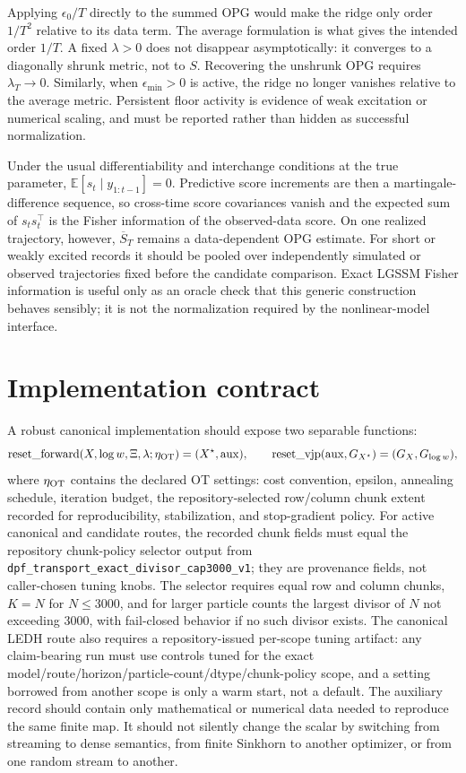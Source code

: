 Applying \(\epsilon_0/T\) directly to the summed OPG would make the ridge only
order \(1/T^2\) relative to its data term.  The average formulation is what
gives the intended order \(1/T\).  A fixed \(\lambda>0\) does not disappear
asymptotically: it converges to a diagonally shrunk metric, not to \(S\).
Recovering the unshrunk OPG requires \(\lambda_T\to0\).  Similarly, when
\(\epsilon_{\min}>0\) is active, the ridge no longer vanishes relative to the
average metric.  Persistent floor activity is evidence of weak excitation or
numerical scaling, and must be reported rather than hidden as successful
normalization.

Under the usual differentiability and interchange conditions at the true
parameter,
\(\mathbb E[s_t\mid y_{1:t-1}]=0\).  Predictive score increments are then a
martingale-difference sequence, so cross-time score covariances vanish and the
expected sum of \(s_ts_t^\top\) is the Fisher information of the observed-data
score.  On one realized trajectory, however, \(\overline S_T\) remains a
data-dependent OPG estimate.  For short or weakly excited records it should be
pooled over independently simulated or observed trajectories fixed before the
candidate comparison.  Exact LGSSM Fisher information is useful only as an
oracle check that this generic construction behaves sensibly; it is not the
normalization required by the nonlinear-model interface.

\section{Implementation contract}
\label{sec:bf-ledh-ot-implementation-contract}

A robust canonical implementation should expose two separable functions:
\[
  \operatorname{reset\_forward}(X,\log w,\Xi,\lambda;\eta_{\rm OT})
  =
  (X^\star,\mathrm{aux}),
  \qquad
  \operatorname{reset\_vjp}(\mathrm{aux},G_{X^\star})
  =
  (G_X,G_{\log w}),
\]
where \(\eta_{\rm OT}\) contains the declared OT settings: cost convention, epsilon,
annealing schedule, iteration budget, the repository-selected row/column chunk
extent recorded for reproducibility, stabilization, and stop-gradient policy.
For active canonical and candidate routes, the recorded chunk fields must equal
the repository chunk-policy selector output from
\texttt{dpf\_transport\_exact\_divisor\_cap3000\_v1}; they are provenance
fields, not caller-chosen tuning knobs.  The selector requires equal row and
column chunks, \(K=N\) for \(N\le 3000\), and for larger particle counts the
largest divisor of \(N\) not exceeding 3000, with fail-closed behavior if no
such divisor exists.  The canonical LEDH route also requires a repository-issued
per-scope tuning artifact: any claim-bearing run must use controls tuned for the
exact model/route/horizon/particle-count/dtype/chunk-policy scope, and a setting
borrowed from another scope is only a warm start, not a default.  The auxiliary
record should contain only mathematical
or numerical data needed to reproduce the same finite map.  It should not
silently change the scalar by switching from streaming to dense semantics, from
finite Sinkhorn to another optimizer, or from one random stream to another.

